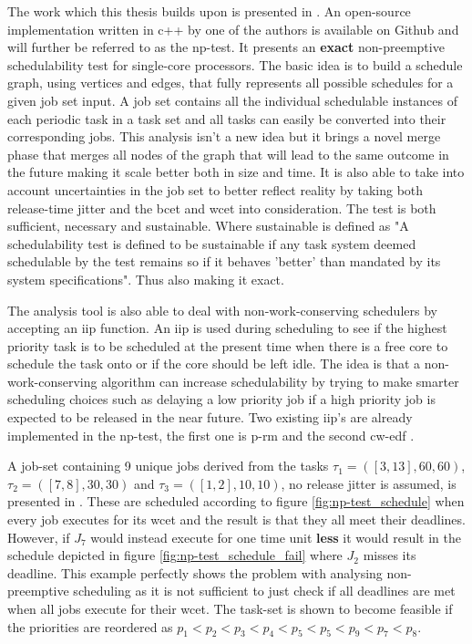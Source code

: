 \documentclass{kththesis}
\begin{document}
The work which this thesis builds upon is presented in \parencite{nasri_exact_2017}. An open-source
implementation written in c++ by one of the authors is available on
Github\parencite{brandenburg_implementation_2018} and will further be referred to as the
\acrfull{np}-test. It presents an \textbf{exact} non-preemptive schedulability test for single-core
processors. The basic idea is to build a schedule graph, using vertices and edges, that fully
represents all possible schedules for a given job set input. A job set contains all the individual
schedulable instances of each periodic task in a task set and all tasks can easily be converted into
their corresponding jobs. This analysis isn't a new idea but it brings a novel merge phase that
merges all nodes of the graph that will lead to the same outcome in the future making it scale better
both in size and time. It is also able to take into account uncertainties in the job set to better
reflect reality by taking both release-time jitter and the \acrshort{bcet} and \acrshort{wcet} into
consideration. The test is both sufficient, necessary and sustainable. Where sustainable is defined
as "A schedulability test is defined to be sustainable if any task system deemed schedulable by the
test remains so if it behaves 'better' than mandated by its system
specifications"\parencite{baruah_sustainable_2006}. Thus also making it exact.

The analysis tool is also able to deal with non-work-conserving schedulers by accepting an
\acrfull{iip} function. An \acrfull{iip} is used during scheduling to see if the highest priority
task is to be scheduled at the present time when there is a free core to schedule the task onto or
if the core should be left idle. The idea is that a non-work-conserving algorithm can increase
schedulability by trying to make smarter scheduling choices such as delaying a low priority job if a
high priority job is expected to be released in the near future. Two existing \acrshort{iip}'s are
already implemented in the \acrshort{np}-test, the first one is \acrfull{p-rm}
\parencite{nasri_precautious-rm:_2014} and the second \acrfull{cw-edf}
\parencite{nasri_non-work-conserving_2016}.

A job-set containing 9 unique jobs derived from the tasks $\tau_1=([3,13], 60, 60)$, $\tau_2=([7,
8], 30, 30)$ and $\tau_3=([1,2], 10, 10)$, no release jitter is assumed, is presented in
\parencite{nasri_exact_2017}. These are scheduled according to figure \ref{fig:np-test_schedule}
when every job executes for its \acrshort{wcet} and the result is that they all meet their
deadlines. However, if $J_7$ would instead execute for one time unit \textbf{less} it would result in the
schedule depicted in figure \ref{fig:np-test_schedule_fail} where $J_2$ misses its deadline. This
example perfectly shows the problem with analysing non-preemptive scheduling as it is not sufficient
to just check if all deadlines are met when all jobs execute for their \acrshort{wcet}. The task-set
is shown to become feasible if the priorities are reordered as $ p_1 < p_2 < p_3 < p_4 < p_5 < p_5 <
p_9 < p_7 < p_8$.
\end{document}
